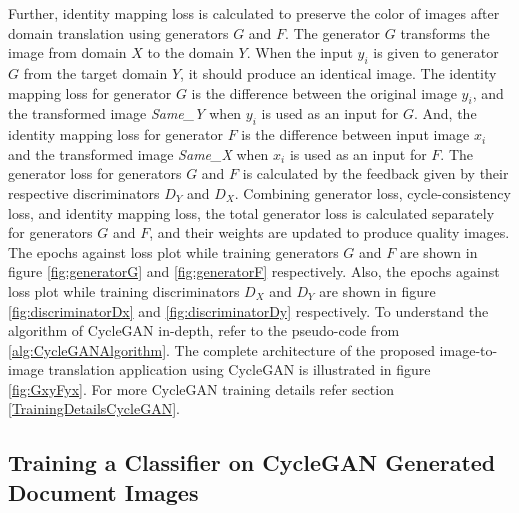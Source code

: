 Further, identity mapping loss is calculated to preserve the color of images after domain translation using generators $G$ and $F$. The generator $G$ transforms the image from domain $X$ to the domain $Y$. When the input $y_i$ is given to generator $G$ from the target domain $Y$, it should produce an identical image. The identity mapping loss for generator $G$ is the difference between the original image $y_i$, and the transformed image \textit{Same\_Y} when $y_i$ is used as an input for $G$. And, the identity mapping loss for generator $F$ is the difference between input image $x_i$ and the transformed image \textit{Same\_X} when $x_i$ is used as an input for $F$. The generator loss for generators $G$ and $F$ is calculated by the feedback given by their respective discriminators $D_Y$ and $D_X$. Combining generator loss, cycle-consistency loss, and identity mapping loss, the total generator loss is calculated separately for generators $G$ and $F$, and their weights are updated to produce quality images. The epochs against loss plot while training generators $G$ and $F$ are shown in figure \ref{fig:generatorG} and \ref{fig:generatorF} respectively. Also, the epochs against loss plot while training discriminators $D_X$ and $D_Y$ are shown in figure \ref{fig:discriminatorDx} and \ref{fig:discriminatorDy} respectively. To understand the algorithm of \ac{CycleGAN} in-depth, refer to the pseudo-code from \ref{alg:CycleGANAlgorithm}. The complete architecture of the proposed image-to-image translation application using \ac{CycleGAN} is illustrated in figure \ref{fig:GxyFyx}. For more \ac{CycleGAN} training details refer section \ref{TrainingDetailsCycleGAN}. 


\subsection{Training a Classifier on \ac{CycleGAN} Generated Document Images}\label{trainingCycleGANDataClassifier}


